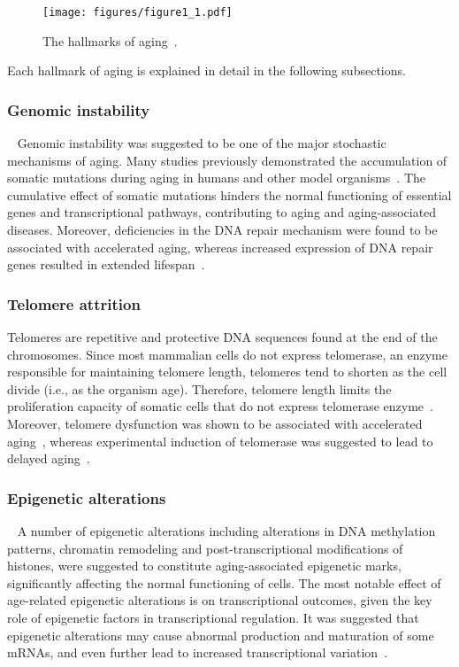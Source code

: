 \begin{figure}[h]
    \centering
    \texttt{[image: figures/figure1\_1.pdf]}
    \caption{The hallmarks of aging~\autocite{Lopez2013}.}
    \label{fig:fig1.1}
\end{figure}

Each hallmark of aging is explained in detail in the following subsections.
\subsubsection{Genomic instability}~\label{hmark:genomic.instability}
Genomic instability was suggested to be one of the major stochastic mechanisms of aging. 
Many studies previously demonstrated the accumulation of somatic mutations during aging in humans and other model organisms~\autocite{Moskalev2013, Lodato2018, Lombard2005, Vijg2004, Lu2004}.
The cumulative effect of somatic mutations hinders the normal functioning of essential genes and transcriptional pathways, contributing to aging and aging-associated diseases.
Moreover, deficiencies in the DNA repair mechanism were found to be associated with accelerated aging, whereas increased expression of DNA repair genes resulted in extended lifespan~\autocite{Stead2021, Symphorien2003}.

\subsubsection{Telomere attrition}
Telomeres are repetitive and protective DNA sequences found at the end of the chromosomes.
Since most mammalian cells do not express telomerase, an enzyme responsible for maintaining telomere length, 
telomeres tend to shorten as the cell divide (i.e., as the organism age). 
Therefore, telomere length limits the proliferation capacity of somatic cells that do not express telomerase enzyme~\autocite{Blasco2007}.
Moreover, telomere dysfunction was shown to be associated with accelerated aging~\autocite{Armanios2009}, 
whereas experimental induction of telomerase was suggested to lead to delayed aging~\autocite{Tomas2008}.

\subsubsection{Epigenetic alterations}~\label{hmark:epigenetic}
A number of epigenetic alterations including alterations in DNA methylation patterns, chromatin remodeling and post-transcriptional modifications of histones, 
were suggested to constitute aging-associated epigenetic marks, significantly affecting the normal functioning of cells.
The most notable effect of age-related epigenetic alterations is on transcriptional outcomes, given the key role of epigenetic factors in transcriptional regulation.
It was suggested that epigenetic alterations may cause abnormal production and maturation of some mRNAs, and even further lead to increased transcriptional variation~\autocite{Ashapkin2017}.

